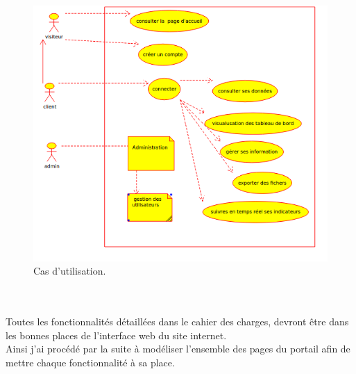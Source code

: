 \documentclass[12pt]{article}
\begin{document}
\begin{center}
\begin{figure}[htp]
  \centering
  \includegraphics[width=12cm]{cd2.png}
  \caption{Cas d'utilisation.}
  \label{fig:une-autre-image}
\end{figure}

\end{center}


\\
\\

Toutes les fonctionnalités détaillées dans le cahier des charges, devront être dans les bonnes places de l'interface web du site internet.\\
Ainsi j'ai procédé par la suite à modéliser l'ensemble des pages du portail afin de mettre chaque 
fonctionnalité à sa place.\\
\end{document}
